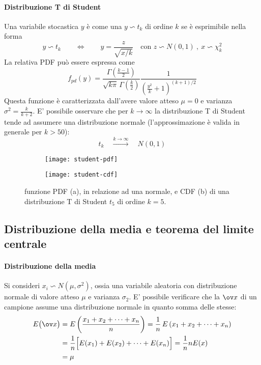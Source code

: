 		\paragraph{Distribuzione T di Student} Una variabile stocastica $y$ è  come una  $y \backsim t_k$ di ordine $k$ se è esprimibile nella forma
		\begin{equation}
			y \backsim t_k \qquad \Leftrightarrow \qquad y = \frac z {\sqrt{x/k}} \quad \textrm{con } z \backsim N (0,1) \ , \ x \backsim \chi_k^2
		\end{equation}
		La relativa PDF può essere espressa come
		\begin{equation}
			f_{pd}(y) = \frac{\Gamma \left(\frac{k-1}{2}\right)}{\sqrt{k\pi} \, \Gamma \left( \frac k 2 \right)} \frac 1 {\left(\frac{y^2}{k} + 1 \right)^{(k+1)/2}}
		\end{equation}
		Questa funzione è caratterizzata dall'avere valore atteso $\mu = 0$ e varianza $\sigma^2 = \frac{k}{k+2}$. E' possibile osservare che per $k\rightarrow \infty$ la distribuzione T di Student tende ad assumere una distribuzione normale (l'approssimazione è valida in generale per $k>50$):
		\[ t_k \quad \xrightarrow{k\rightarrow \infty} \quad N(0,1)\]
		
		\begin{figure}[bht]
			\centering
			\begin{subfigure}{0.48\linewidth}
				\centering
				\texttt{[image: student-pdf]} \caption{}
			\end{subfigure}
			\begin{subfigure}{0.48\linewidth}
				\centering
				\texttt{[image: student-cdf]} \caption{}
			\end{subfigure}
			\caption{funzione PDF (a), in relazione ad una normale, e CDF (b) di una distribuzione T di Student $t_5$ di ordine $k=5$.}
			\label{fig:stat:student}
		\end{figure}
		
		
	\subsection{Distribuzione della media e teorema del limite centrale}
		
		\paragraph{Distribuzione della media} Si consideri $x_i \backsim N(\mu, \sigma^2)$, ossia una variabile aleatoria  con distribuzione normale di valore atteso $\mu$ e varianza $\sigma_2$. E' possibile verificare che la  $\ov x$ di un campione assume una distribuzione normale in quanto somma delle stesse:
		\begin{align*}
			E\big(\ov x\big) & = E \left(\frac{x_1 + x_2 + \dots  
			 + x_n}{n}\right) = \frac 1 n \, E\left(x_1 + x_2+\dots +x_n\right) \\ 
		 	& = \frac 1 n \Big[ E(x_1) + E(x_2) + \dots + E(x_n)\Big] = \frac 1 n n E(x) \\
		 	& = \mu 
		\end{align*}
		
